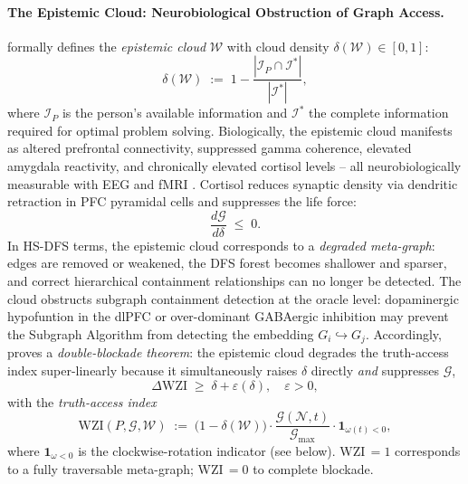 ﻿\documentclass[12pt,a4paper]{article}
\theoremstyle{plain}
\theoremstyle{definition}
\theoremstyle{remark}
\begin{document}
	\paragraph{The Epistemic Cloud: Neurobiological Obstruction of Graph Access.}
	\cite{epp2026brain} formally defines the \emph{epistemic cloud}
	$\mathcal{W}$ with cloud density $\delta(\mathcal{W}) \in [0,1]$:
	\[
	\delta(\mathcal{W}) \;:=\; 1 - \frac{|\mathcal{I}_P \cap \mathcal{I}^*|}{|\mathcal{I}^*|},
	\]
	where $\mathcal{I}_P$ is the person's available information and
	$\mathcal{I}^*$ the complete information required for optimal problem
	solving.  Biologically, the epistemic cloud manifests as altered prefrontal
	connectivity, suppressed gamma coherence, elevated amygdala reactivity, and
	chronically elevated cortisol levels -- all neurobiologically measurable
	with EEG and fMRI \cite{epp2026brain}.  Cortisol reduces synaptic density
	via dendritic retraction in PFC pyramidal cells \cite{radley2004} and
	suppresses the life force:
	\[
	\frac{d\mathcal{G}}{d\delta} \;\leq\; 0.
	\]
	In HS-DFS terms, the epistemic cloud corresponds to a \emph{degraded
		meta-graph}: edges are removed or weakened, the DFS forest becomes
	shallower and sparser, and correct hierarchical containment relationships
	can no longer be detected.  The cloud obstructs subgraph containment
	detection at the oracle level: dopaminergic hypofuntion in the dlPFC
	\cite{goldmanrakic1995} or over-dominant GABAergic inhibition may prevent
	the Subgraph Algorithm from detecting the embedding
	$G_i \hookrightarrow G_j$.  Accordingly, \cite{epp2026brain} proves
	a \emph{double-blockade theorem}: the epistemic cloud degrades the
	truth-access index super-linearly because it simultaneously raises
	$\delta$ directly \emph{and} suppresses $\mathcal{G}$,
	\[
	\Delta\mathrm{WZI} \;\geq\; \delta + \varepsilon(\delta),\quad \varepsilon > 0,
	\]
	with the \emph{truth-access index} \cite{epp2026brain}
	\[
	\mathrm{WZI}(P, \mathcal{G}, \mathcal{W}) \;:=\;
	\bigl(1 - \delta(\mathcal{W})\bigr) \cdot
	\frac{\mathcal{G}(\mathcal{N},t)}{\mathcal{G}_{\max}} \cdot
	\mathbf{1}_{\omega(t) < 0},
	\]
	where $\mathbf{1}_{\omega < 0}$ is the clockwise-rotation indicator (see
	below).  WZI\,$= 1$ corresponds to a fully traversable meta-graph;
	WZI\,$= 0$ to complete blockade.
	
\end{document}
